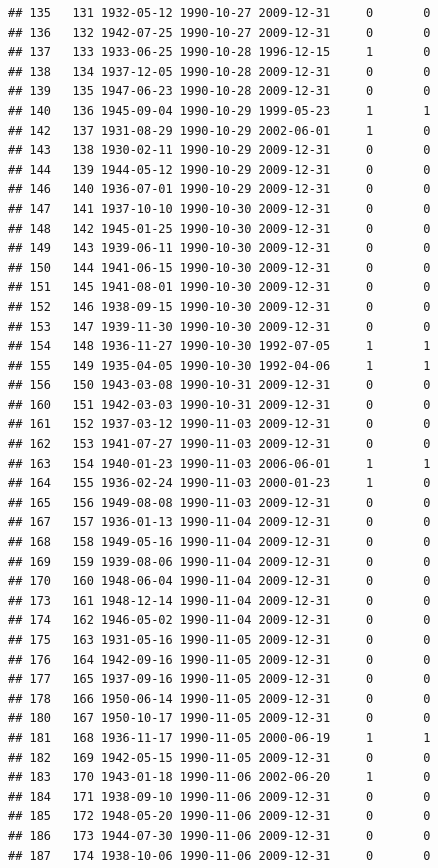 \documentclass[
]{book}
\theoremstyle{definition}
\theoremstyle{definition}
\theoremstyle{definition}
\theoremstyle{definition}
\theoremstyle{remark}
\begin{document}
\begin{verbatim}
## 135   131 1932-05-12 1990-10-27 2009-12-31     0       0
## 136   132 1942-07-25 1990-10-27 2009-12-31     0       0
## 137   133 1933-06-25 1990-10-28 1996-12-15     1       0
## 138   134 1937-12-05 1990-10-28 2009-12-31     0       0
## 139   135 1947-06-23 1990-10-28 2009-12-31     0       0
## 140   136 1945-09-04 1990-10-29 1999-05-23     1       1
## 142   137 1931-08-29 1990-10-29 2002-06-01     1       0
## 143   138 1930-02-11 1990-10-29 2009-12-31     0       0
## 144   139 1944-05-12 1990-10-29 2009-12-31     0       0
## 146   140 1936-07-01 1990-10-29 2009-12-31     0       0
## 147   141 1937-10-10 1990-10-30 2009-12-31     0       0
## 148   142 1945-01-25 1990-10-30 2009-12-31     0       0
## 149   143 1939-06-11 1990-10-30 2009-12-31     0       0
## 150   144 1941-06-15 1990-10-30 2009-12-31     0       0
## 151   145 1941-08-01 1990-10-30 2009-12-31     0       0
## 152   146 1938-09-15 1990-10-30 2009-12-31     0       0
## 153   147 1939-11-30 1990-10-30 2009-12-31     0       0
## 154   148 1936-11-27 1990-10-30 1992-07-05     1       1
## 155   149 1935-04-05 1990-10-30 1992-04-06     1       1
## 156   150 1943-03-08 1990-10-31 2009-12-31     0       0
## 160   151 1942-03-03 1990-10-31 2009-12-31     0       0
## 161   152 1937-03-12 1990-11-03 2009-12-31     0       0
## 162   153 1941-07-27 1990-11-03 2009-12-31     0       0
## 163   154 1940-01-23 1990-11-03 2006-06-01     1       1
## 164   155 1936-02-24 1990-11-03 2000-01-23     1       0
## 165   156 1949-08-08 1990-11-03 2009-12-31     0       0
## 167   157 1936-01-13 1990-11-04 2009-12-31     0       0
## 168   158 1949-05-16 1990-11-04 2009-12-31     0       0
## 169   159 1939-08-06 1990-11-04 2009-12-31     0       0
## 170   160 1948-06-04 1990-11-04 2009-12-31     0       0
## 173   161 1948-12-14 1990-11-04 2009-12-31     0       0
## 174   162 1946-05-02 1990-11-04 2009-12-31     0       0
## 175   163 1931-05-16 1990-11-05 2009-12-31     0       0
## 176   164 1942-09-16 1990-11-05 2009-12-31     0       0
## 177   165 1937-09-16 1990-11-05 2009-12-31     0       0
## 178   166 1950-06-14 1990-11-05 2009-12-31     0       0
## 180   167 1950-10-17 1990-11-05 2009-12-31     0       0
## 181   168 1936-11-17 1990-11-05 2000-06-19     1       1
## 182   169 1942-05-15 1990-11-05 2009-12-31     0       0
## 183   170 1943-01-18 1990-11-06 2002-06-20     1       0
## 184   171 1938-09-10 1990-11-06 2009-12-31     0       0
## 185   172 1948-05-20 1990-11-06 2009-12-31     0       0
## 186   173 1944-07-30 1990-11-06 2009-12-31     0       0
## 187   174 1938-10-06 1990-11-06 2009-12-31     0       0

\end{verbatim}
\end{document}
